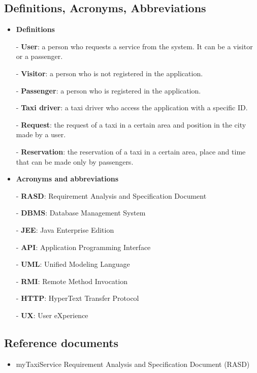 	\subsection{Definitions, Acronyms, Abbreviations}
		\begin{itemize}
			\item \textbf{Definitions}
				\item[-] \textbf{User}: a person who requests a service from the system. It can be a visitor or a passenger.
				\item[-] \textbf{Visitor}: a person who is not registered in the application.
				\item[-] \textbf{Passenger}: a person who is registered in the application.
				\item[-] \textbf{Taxi driver}: a taxi driver who access the application with a specific ID.
				\item[-] \textbf{Request}: the request of a taxi in a certain area and position in the city made by a user.
				\item[-] \textbf{Reservation}: the reservation of a taxi in a certain area, place and time that can be made only by passengers.

			\item \textbf{Acronyms and abbreviations}
				\item[-] \textbf{RASD}: Requirement Analysis and Specification Document
				\item[-] \textbf{DBMS}: Database Management System
				\item[-] \textbf{JEE}: Java Enterprise Edition
				\item[-] \textbf{API}: Application Programming Interface
				\item[-] \textbf{UML}: Unified Modeling Language
				\item[-] \textbf{RMI}: Remote Method Invocation
				\item[-] \textbf{HTTP}: HyperText Transfer Protocol
				\item[-] \textbf{UX}: User eXperience
			
		\end{itemize}
	\subsection{Reference documents}
		\begin{itemize}
			\item myTaxiService Requirement Analysis and Specification Document (RASD)
	\newpage		
		\end{itemize}
